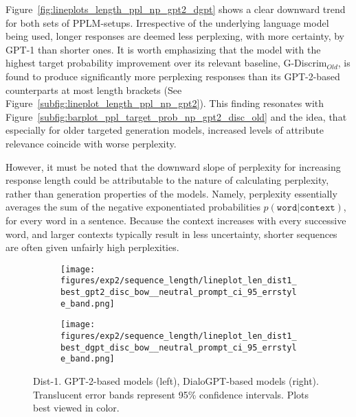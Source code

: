 
Figure~\ref{fig:lineplots_length_ppl_np_gpt2_dgpt} shows a clear downward trend for both sets of PPLM-setups. Irrespective of the underlying language model being used, longer responses are deemed less perplexing, with more certainty, by GPT-1 than shorter ones. It is worth emphasizing that the model with the highest target probability improvement over its relevant baseline, G-Discrim$_{Old}$, is found to produce significantly more perplexing responses than its GPT-2-based counterparts at most length brackets (See Figure~\ref{subfig:lineplot_length_ppl_np_gpt2}). This finding resonates with Figure~\ref{subfig:barplot_ppl_target_prob_np_gpt2_disc_old} and the idea, that especially for older targeted generation models, increased levels of attribute relevance coincide with worse perplexity.

However, it must be noted that the downward slope of perplexity for increasing response length could be attributable to the nature of calculating perplexity, rather than generation properties of the models. Namely, perplexity essentially averages the sum of the negative exponentiated probabilities $p(\texttt{word} | \texttt{context})$, for every word in a sentence. Because the context increases with every successive word, and larger contexts typically result in less uncertainty, shorter sequences are often given unfairly high perplexities.

\begin{figure}[H]
     \centering
     \begin{subfigure}[b]{0.49\textwidth}
        \centering
\texttt{[image: figures/exp2/sequence\_length/lineplot\_len\_dist1\_best\_gpt2\_disc\_bow\_\_neutral\_prompt\_ci\_95\_errstyle\_band.png]}
        \caption{}
        \label{subfig:lineplot_length_dist1_np_gpt2}
     \end{subfigure}
     \hfill
     \begin{subfigure}[b]{0.49\textwidth}
        \centering
        \texttt{[image: figures/exp2/sequence\_length/lineplot\_len\_dist1\_best\_dgpt\_disc\_bow\_\_neutral\_prompt\_ci\_95\_errstyle\_band.png]}
        \caption{}
        \label{subfig:lineplot_length_dist1_np_dgpt}
     \end{subfigure}
        \caption{Dist-1. GPT-2-based models (left), DialoGPT-based models (right). Translucent error bands represent 95\% confidence intervals. Plots best viewed in color.}
        \label{fig:lineplots_length_dist1_np_gpt2_dgpt}
\end{figure}

